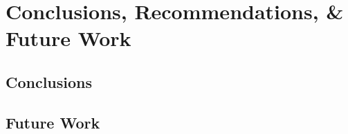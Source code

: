 \chapter{Conclusions, Recommendations, \& Future Work}\label{ch:Conclusions}
  \section{Conclusions}\label{sec:Conclusions}
    \lipsum[34-36]
  \section{Future Work}\label{sec:futureWork}
    \lipsum[38]\cite{TEST}
	
  \printreferences 
